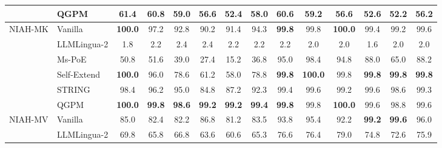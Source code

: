 \documentclass[11pt]{article}
\begin{document}
\begin{table}[t]
\begin{tabular*}{\textwidth}{@{\extracolsep{\fill}} ll cccccc @{\hspace{10pt}} cccccc @{}}
 & QGPM & \phantom{0}61.4 & \textbf{\phantom{0}60.8} & \textbf{\phantom{0}59.0} & \textbf{\phantom{0}56.6} & \textbf{\phantom{0}52.4} & \textbf{\phantom{0}58.0} & \phantom{0}60.6 & \phantom{0}59.2 & \phantom{0}56.6 & \phantom{0}52.6 & \phantom{0}52.2 & \phantom{0}56.2 \\
\midrule
\multirow{6}{*}{NIAH-MK} & Vanilla & \textbf{100.0} & \phantom{0}97.2 & \phantom{0}92.8 & \phantom{0}90.2 & \phantom{0}91.4 & \phantom{0}94.3 & \textbf{\phantom{0}99.8} & \phantom{0}99.8 & \textbf{100.0} & \phantom{0}99.4 & \phantom{0}99.2 & \phantom{0}99.6 \\
 & LLMLingua-2 & \phantom{00}1.8 & \phantom{00}2.2 & \phantom{00}2.4 & \phantom{00}2.4 & \phantom{00}2.2 & \phantom{00}2.2 & \phantom{00}2.2 & \phantom{00}2.0 & \phantom{00}2.0 & \phantom{00}1.6 & \phantom{00}2.0 & \phantom{00}2.0 \\
 & Ms-PoE & \phantom{0}50.8 & \phantom{0}51.6 & \phantom{0}39.0 & \phantom{0}27.4 & \phantom{0}15.2 & \phantom{0}36.8 & \phantom{0}95.0 & \phantom{0}98.4 & \phantom{0}94.8 & \phantom{0}88.0 & \phantom{0}65.0 & \phantom{0}88.2 \\
 & Self-Extend & \textbf{100.0} & \phantom{0}96.0 & \phantom{0}78.6 & \phantom{0}61.2 & \phantom{0}58.0 & \phantom{0}78.8 & \textbf{\phantom{0}99.8} & \textbf{100.0} & \phantom{0}99.8 & \textbf{\phantom{0}99.8} & \textbf{\phantom{0}99.8} & \textbf{\phantom{0}99.8} \\
 & STRING & \phantom{0}98.4 & \phantom{0}96.2 & \phantom{0}95.0 & \phantom{0}84.8 & \phantom{0}87.2 & \phantom{0}92.3 & \phantom{0}99.4 & \phantom{0}99.6 & \phantom{0}99.2 & \phantom{0}99.6 & \phantom{0}98.6 & \phantom{0}99.3 \\
 & QGPM & \textbf{100.0} & \textbf{\phantom{0}99.8} & \textbf{\phantom{0}98.6} & \textbf{\phantom{0}99.2} & \textbf{\phantom{0}99.2} & \textbf{\phantom{0}99.4} & \textbf{\phantom{0}99.8} & \phantom{0}99.8 & \textbf{100.0} & \phantom{0}99.6 & \phantom{0}98.8 & \phantom{0}99.6 \\
\midrule
\multirow{6}{*}{NIAH-MV} & Vanilla & \phantom{0}85.0 & \phantom{0}82.4 & \phantom{0}82.2 & \phantom{0}86.8 & \phantom{0}81.2 & \phantom{0}83.5 & \phantom{0}93.8 & \phantom{0}95.4 & \phantom{0}92.2 & \textbf{\phantom{0}99.2} & \textbf{\phantom{0}99.6} & \phantom{0}96.0 \\
 & LLMLingua-2 & \phantom{0}69.8 & \phantom{0}65.8 & \phantom{0}66.8 & \phantom{0}63.6 & \phantom{0}60.6 & \phantom{0}65.3 & \phantom{0}76.6 & \phantom{0}76.4 & \phantom{0}79.0 & \phantom{0}74.8 & \phantom{0}72.6 & \phantom{0}75.9 \\

\end{tabular*}
\end{table}
\end{document}

